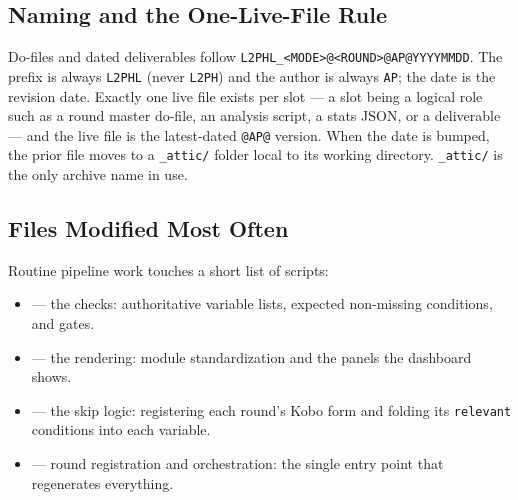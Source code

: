 \subsection{Naming and the One-Live-File Rule}

Do-files and dated deliverables follow \texttt{L2PHL\_<MODE>@<ROUND>@AP@YYYYMMDD}. The prefix is always \texttt{L2PHL} (never \texttt{L2PH}) and the author is always \texttt{AP}; the date is the revision date. Exactly one live file exists per slot --- a slot being a logical role such as a round master do-file, an analysis script, a stats JSON, or a deliverable --- and the live file is the latest-dated \texttt{@AP@} version. When the date is bumped, the prior file moves to a \texttt{\_attic/} folder local to its working directory. \texttt{\_attic/} is the only archive name in use.

\subsection{Files Modified Most Often}

Routine pipeline work touches a short list of scripts:

\begin{itemize}
  \item {} --- the checks: authoritative variable lists, expected non-missing conditions, and gates.
  \item {} --- the rendering: module standardization and the panels the dashboard shows.
  \item {} --- the skip logic: registering each round's Kobo form and folding its \texttt{relevant} conditions into each variable.
  \item {} --- round registration and orchestration: the single entry point that regenerates everything.
\end{itemize}
